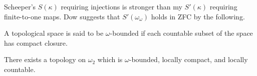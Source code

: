 \documentclass[11pt]{article}
\begin{document}
  \begin{remark}
    Scheeper's \(S(\kappa)\) requiring injections is stronger than my
    \(S'(\kappa)\) requiring finite-to-one maps. Dow suggests that
    \(S'(\omega_\omega)\) holds in ZFC by the following.
  \end{remark}

  \begin{definition}
    A topological space is said to be \(\omega\)-bounded if each countable
    subset of the space has compact closure.
  \end{definition}

  \begin{theorem}
    There exists a topology on \(\omega_2\) which
    is \(\omega\)-bounded, locally compact, and locally countable.
  \end{theorem}
\end{document}
